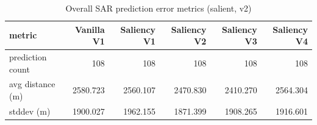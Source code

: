 \begin{table}[ht]
\centering
\caption{Overall SAR prediction error metrics (salient, v2)}
\label{tab:sar-overall-errors-salient,-v2}
\begin{tabular}{lrrrrr}
\hline
metric & Vanilla V1 & Saliency V1 & Saliency V2 & Saliency V3 & Saliency V4 \\
\hline
prediction count & 108 & 108 & 108 & 108 & 108 \\
avg distance (m) & 2580.723 & 2560.107 & 2470.830 & 2410.270 & 2564.304 \\
stddev (m) & 1900.027 & 1962.155 & 1871.399 & 1908.265 & 1916.601 \\
\hline
\end{tabular}
\end{table}
